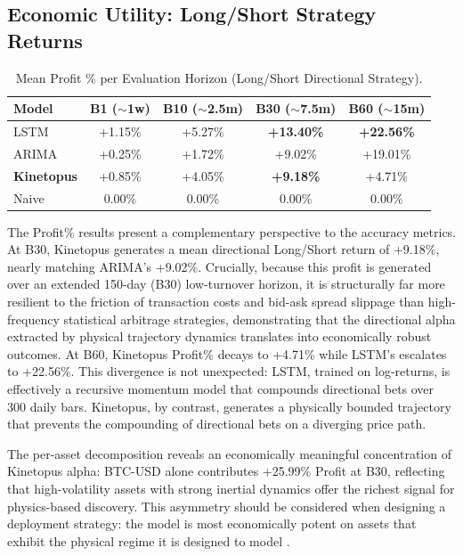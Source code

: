 \documentclass[11pt,a4paper]{article}
\begin{document}
\subsection{Economic Utility: Long/Short Strategy Returns}

\begin{table}[H]
\centering
\small
\caption{Mean Profit \% per Evaluation Horizon (Long/Short Directional Strategy).}
\label{tab:profit_results}
\begin{tabular}{lcccc}
\toprule
\textbf{Model} & \textbf{B1 ($\sim$1w)} & \textbf{B10 ($\sim$2.5m)} & \textbf{B30 ($\sim$7.5m)} & \textbf{B60 ($\sim$15m)} \\
\midrule
LSTM & +1.15\% & +5.27\% & \textbf{+13.40\%} & \textbf{+22.56\%} \\
ARIMA & +0.25\% & +1.72\% & +9.02\% & +19.01\% \\
\textbf{Kinetopus} & +0.85\% & +4.05\% & \textbf{+9.18\%} & +4.71\% \\
Naive & 0.00\% & 0.00\% & 0.00\% & 0.00\% \\
\bottomrule
\end{tabular}
\end{table}

The Profit\% results present a complementary perspective to the accuracy metrics. At B30, Kinetopus generates a mean directional Long/Short return of +9.18\%, nearly matching ARIMA's +9.02\%. Crucially, because this profit is generated over an extended 150-day (B30) low-turnover horizon, it is structurally far more resilient to the friction of transaction costs and bid-ask spread slippage than high-frequency statistical arbitrage strategies, demonstrating that the directional alpha extracted by physical trajectory dynamics translates into economically robust outcomes. At B60, Kinetopus Profit\% decays to +4.71\% while LSTM's escalates to +22.56\%. This divergence is not unexpected: LSTM, trained on log-returns, is effectively a recursive momentum model that compounds directional bets over 300 daily bars. Kinetopus, by contrast, generates a physically bounded trajectory that prevents the compounding of directional bets on a diverging price path.

The per-asset decomposition reveals an economically meaningful concentration of Kinetopus alpha: BTC-USD alone contributes +25.99\% Profit at B30, reflecting that high-volatility assets with strong inertial dynamics offer the richest signal for physics-based discovery. This asymmetry should be considered when designing a deployment strategy: the model is most economically potent on assets that exhibit the physical regime it is designed to model \cite{fischer2018deep}.
\end{document}
